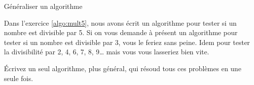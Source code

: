 	\begin{Exercice}{Généraliser un algorithme}
		
		Dans l’exercice \vref{algo:mult5}, nous avons écrit un algorithme pour
		tester si un nombre est divisible par 5.  Si on vous demande à présent
		un algorithme pour tester si un nombre est divisible par 3, vous le
		feriez sans peine.  Idem pour tester la divisibilité par 2, 4, 6, 7, 8,
		9\dots{} mais vous vous lasseriez bien vite.

		Écrivez un seul algorithme, plus général, qui résoud tous ces problèmes
		en une seule fois. 
	
	\end{Exercice}


